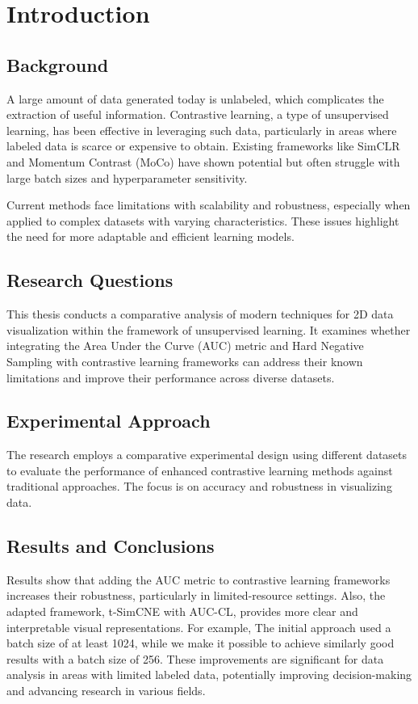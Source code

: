 \chapter{Introduction}
\label{chap:intro}

\section{Background}
A large amount of data generated today is unlabeled, which complicates the extraction of useful information. Contrastive learning, a type of unsupervised learning, has been effective in leveraging such data, particularly in areas where labeled data is scarce or expensive to obtain. Existing frameworks like SimCLR \cite{simclr} and Momentum Contrast (MoCo) \cite{moco} have shown potential but often struggle with large batch sizes and hyperparameter sensitivity.

Current methods face limitations with scalability and robustness, especially when applied to complex datasets with varying characteristics. These issues highlight the need for more adaptable and efficient learning models.

\section{Research Questions}
This thesis conducts a comparative analysis of modern techniques for 2D data visualization within the framework of unsupervised learning. It examines whether integrating the Area Under the Curve (AUC) metric \cite{sharma2023auc} and Hard Negative Sampling \cite{robinson2020contrastive} with contrastive learning frameworks can address their known limitations and improve their performance across diverse datasets.

\section{Experimental Approach}
The research employs a comparative experimental design using different datasets to evaluate the performance of enhanced contrastive learning methods against traditional approaches. The focus is on accuracy and robustness in visualizing data.

\section{Results and Conclusions}
Results show that adding the AUC metric to contrastive learning frameworks increases their robustness, particularly in limited-resource settings. Also, the adapted framework, t-SimCNE with AUC-CL, provides more clear and interpretable visual representations. For example, The initial approach used a batch size of at least 1024, while we make it possible to achieve similarly good results with a batch size of 256.
These improvements are significant for data analysis in areas with limited labeled data, potentially improving decision-making and advancing research in various fields.

